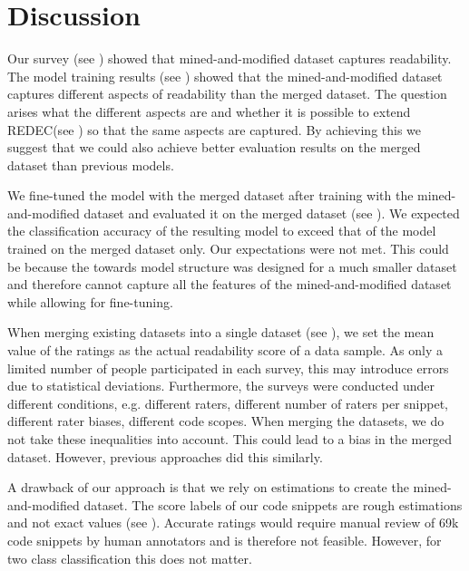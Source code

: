 \documentclass[%
class=scrreprt,
chapterprefix=false,%
open=right,%
twoside=false,%
paper=a4,%
logofile={Logo\_zentral\_farbig\_EN.png},%
thesistype=master,%
UKenglish,%
]{se2thesis}
\theoremstyle{definition}
\newcommand{\citeolddataset}{\cite{buse2009learning, dorn2012general, scalabrino2018comprehensive}\xspace}
\newcommand{\numSamples}{69k\xspace}
\newcommand{\rdh}{REDEC\xspace}
\begin{document}
\section{Discussion} \label{Discussion}

	Our survey (see ) showed that mined-and-modified dataset captures readability. The model training results (see ) showed that the mined-and-modified dataset captures different aspects of readability than the merged dataset. 	
	The question arises what the different aspects are and whether it is possible to extend \rdh (see ) so that the same aspects are captured. By achieving this we suggest that we could also achieve better evaluation results on the merged dataset than previous models.
	
	We fine-tuned the model with the merged dataset after training with the mined-and-modified dataset and evaluated it on the merged dataset (see ). We expected the classification accuracy of the resulting model to exceed that of the model trained on the merged dataset only.
	Our expectations were not met. This could be because the towards model structure was designed for a much smaller dataset and therefore cannot capture all the features of the mined-and-modified dataset while allowing for fine-tuning.

	When merging existing datasets \citeolddataset into a single dataset (see ), we set the mean value of the ratings as the actual readability score of a data sample. As only a limited number of people participated in each survey, this may introduce errors due to statistical deviations.
	Furthermore, the surveys were conducted under different conditions, e.g. different raters, different number of raters per snippet, different rater biases, different code scopes. When merging the datasets, we do not take these inequalities into account. This could lead to a bias in the merged dataset. However, previous approaches did this similarly.
	
	A drawback of our approach is that we rely on estimations to create the mined-and-modified dataset. The score labels of our code snippets are rough estimations and not exact values (see ). Accurate ratings would require manual review of \numSamples code snippets by human annotators and is therefore not feasible. However, for two class classification this does not matter.
	
\end{document}
